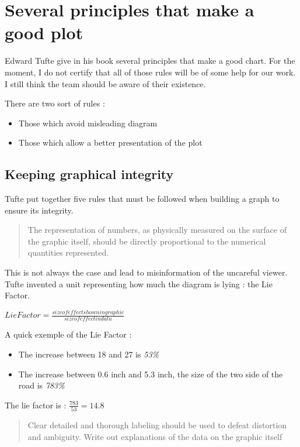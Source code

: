 \section{Several principles that make a good plot}
Edward Tufte give in his book several principles that make a good chart. For the moment, I do not certify that all of those rules will be of some help for our work. I still think the team should be aware of their existence.

There are two sort of rules :
\begin{itemize}
\item Those which avoid misleading diagram  
\item Those which allow a better presentation of the plot
\end{itemize}

\subsection{Keeping graphical integrity} 
Tufte put together five rules that must be followed when building a graph to ensure its integrity.

\begin{quote}
The representation of numbers, as physically measured on the surface of the graphic itself, should be directly proportional to the numerical quantities represented.
\end{quote}
This is not always the case and lead to misinformation of the uncareful viewer. Tufte invented a unit representing how much the diagram is lying : the Lie Factor.

$Lie Factor = \frac{size of effect shown in graphic}{size of effect in data}$

A quick exemple of the Lie Factor :


\begin{itemize}
\item The increase between 18 and 27 is \emph{53\%}
\item The increase between 0.6 inch and 5.3 inch, the size of the two side of the road is \emph{783\%}
\end{itemize}

The lie factor is  : $\frac{783}{53} = 14.8$ 

\begin{quote}
Clear detailed and thorough labeling should be used to defeat distortion and ambiguity. Write out explanations of the data on the graphic itself
\end{quote}

